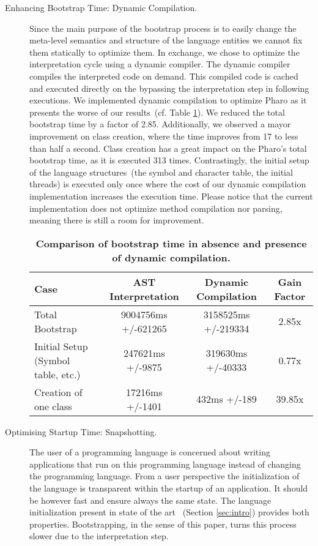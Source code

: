 \begin{description}
\item[Enhancing Bootstrap Time: Dynamic Compilation.]
Since the main purpose of the bootstrap process is to easily change the meta-level semantics and structure of the language entities we cannot fix them statically to optimize them. In exchange, we chose to optimize the interpretation cycle using a dynamic compiler. The dynamic compiler compiles the interpreted code on demand. This compiled code is cached and executed directly on the \VM bypassing the interpretation step in following executions. We implemented dynamic compilation to optimize Pharo as it presents the worse of our results~(cf. Table \ref{tb:dynamic_compilation}). We reduced the total bootstrap time by a factor of 2.85. Additionally, we observed a mayor improvement on class creation, where the time improves from 17 to less than half a second. Class creation has a great impact on the Pharo's total bootstrap time, as it is executed 313 times. Contrastingly, the initial setup of the language structures~(\eg the symbol and character table, the initial threads) is executed only once where the cost of our dynamic compilation implementation increases the execution time. Please notice that the current implementation does not optimize method compilation nor parsing, meaning there is still a room for improvement.

 \begin{table}[ht]
 \small
 	\centering
 	\begin{tabular}{|l|c|c|c|}
			\hline
			\textbf{Case}
 			& \textbf{AST Interpretation}
			& \textbf{Dynamic Compilation}
			& \textbf{Gain Factor}\\
		\hline
		Total Bootstrap & 9004756ms +/-621265 & 3158525ms +/-219334 & 2.85x\\\hline
 		Initial Setup (Symbol table, etc.) & 247621ms +/-9875 & 319630ms +/-40333 & 0.77x\\\hline
		Creation of one class & 17216ms +/-1401 & 432ms +/-189 & 39.85x\\\hline
 	\end{tabular}
	\vspace*{0.2cm}
 	\caption{\small\textbf{Comparison of bootstrap time in absence and presence of dynamic compilation.}\label{tb:dynamic_compilation}}
 \end{table}

\item[Optimising Startup Time: Snapshotting.]\label{sec:snapshot}
The user of a programming language is concerned about writing applications that run on this programming language instead of changing the programming language. From a user perspective the initialization of the language is transparent within the startup of an application. It should be however fast and ensure always the same state.
The language initialization present in state of the art \VMs~(Section \ref{sec:intro}) provides both properties. Bootstrapping, in the sense of this paper, turns this process slower due to the interpretation step.


\end{description}
